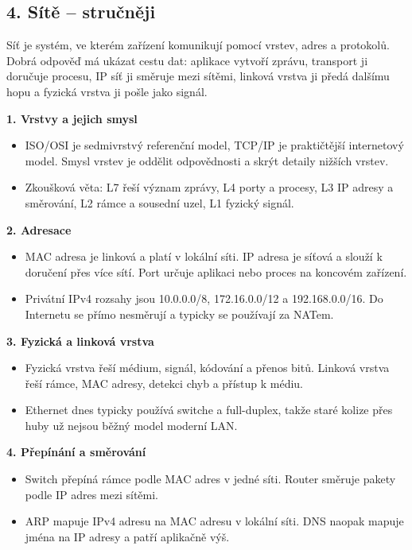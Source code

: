 
\subsection*{4. Sítě -- stručněji}
Síť je systém, ve kterém zařízení komunikují pomocí vrstev, adres a protokolů. Dobrá odpověď má ukázat cestu dat: aplikace vytvoří zprávu, transport ji doručuje procesu, IP síť ji směruje mezi sítěmi, linková vrstva ji předá dalšímu hopu a fyzická vrstva ji pošle jako signál.

\textbf{1. Vrstvy a jejich smysl}
\begin{itemize}
  \item ISO/OSI je sedmivrstvý referenční model, TCP/IP je praktičtější internetový model. Smysl vrstev je oddělit odpovědnosti a skrýt detaily nižších vrstev.
  \item Zkoušková věta: L7 řeší význam zprávy, L4 porty a procesy, L3 IP adresy a směrování, L2 rámce a sousední uzel, L1 fyzický signál.
\end{itemize}

\textbf{2. Adresace}
\begin{itemize}
  \item MAC adresa je linková a platí v lokální síti. IP adresa je síťová a slouží k doručení přes více sítí. Port určuje aplikaci nebo proces na koncovém zařízení.
  \item Privátní IPv4 rozsahy jsou 10.0.0.0/8, 172.16.0.0/12 a 192.168.0.0/16. Do Internetu se přímo nesměrují a typicky se používají za NATem.
\end{itemize}

\textbf{3. Fyzická a linková vrstva}
\begin{itemize}
  \item Fyzická vrstva řeší médium, signál, kódování a přenos bitů. Linková vrstva řeší rámce, MAC adresy, detekci chyb a přístup k médiu.
  \item Ethernet dnes typicky používá switche a full-duplex, takže staré kolize přes huby už nejsou běžný model moderní LAN.
\end{itemize}

\textbf{4. Přepínání a směrování}
\begin{itemize}
  \item Switch přepíná rámce podle MAC adres v jedné síti. Router směruje pakety podle IP adres mezi sítěmi.
  \item ARP mapuje IPv4 adresu na MAC adresu v lokální síti. DNS naopak mapuje jména na IP adresy a patří aplikačně výš.
\end{itemize}

